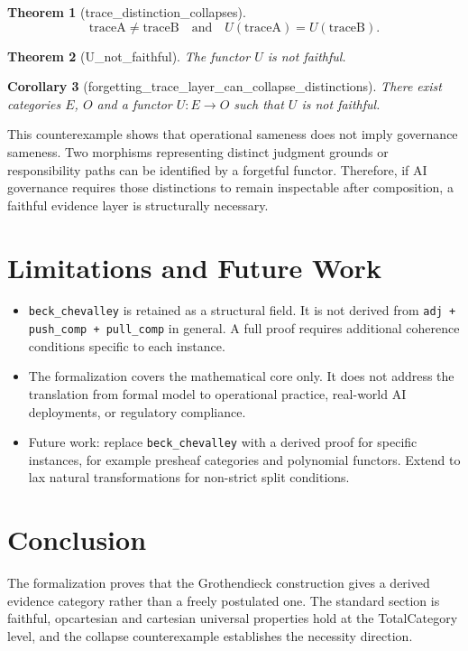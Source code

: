 \documentclass{article}
\newtheorem{theorem}{Theorem}
\newtheorem{corollary}[theorem]{Corollary}
\begin{document}
\begin{theorem}[trace\_distinction\_collapses]
\[
  \mathrm{traceA}\neq \mathrm{traceB}
  \quad\text{and}\quad
  U(\mathrm{traceA}) = U(\mathrm{traceB}).
\]
\end{theorem}

\begin{theorem}[U\_not\_faithful]
The functor $U$ is not faithful.
\end{theorem}

\begin{corollary}[forgetting\_trace\_layer\_can\_collapse\_distinctions]
There exist categories $E$, $O$ and a functor $U : E \to O$ such that $U$ is not faithful.
\end{corollary}

This counterexample shows that operational sameness does not imply governance sameness. Two morphisms representing distinct judgment grounds or responsibility paths can be identified by a forgetful functor. Therefore, if AI governance requires those distinctions to remain inspectable after composition, a faithful evidence layer is structurally necessary.

\section{Limitations and Future Work}

\begin{itemize}
\item \texttt{beck\_chevalley} is retained as a structural field. It is not derived from \texttt{adj + push\_comp + pull\_comp} in general. A full proof requires additional coherence conditions specific to each instance.
\item The formalization covers the mathematical core only. It does not address the translation from formal model to operational practice, real-world AI deployments, or regulatory compliance.
\item Future work: replace \texttt{beck\_chevalley} with a derived proof for specific instances, for example presheaf categories and polynomial functors. Extend to lax natural transformations for non-strict split conditions.
\end{itemize}

\section{Conclusion}

The formalization proves that the Grothendieck construction gives a derived evidence category rather than a freely postulated one. The standard section is faithful, opcartesian and cartesian universal properties hold at the TotalCategory level, and the collapse counterexample establishes the necessity direction.
\end{document}
